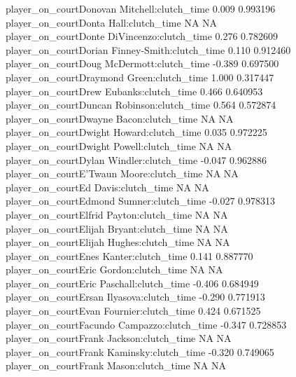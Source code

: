 \documentclass[
  landscape]{article}
\begin{document}
{player\_on\_courtDonovan Mitchell:clutch\_time 0.009 0.993196\\
player\_on\_courtDonta Hall:clutch\_time NA NA\\
player\_on\_courtDonte DiVincenzo:clutch\_time 0.276 0.782609\\
player\_on\_courtDorian Finney-Smith:clutch\_time 0.110 0.912460\\
player\_on\_courtDoug McDermott:clutch\_time -0.389 0.697500\\
player\_on\_courtDraymond Green:clutch\_time 1.000 0.317447\\
player\_on\_courtDrew Eubanks:clutch\_time 0.466 0.640953\\
player\_on\_courtDuncan Robinson:clutch\_time 0.564 0.572874\\
player\_on\_courtDwayne Bacon:clutch\_time NA NA\\
player\_on\_courtDwight Howard:clutch\_time 0.035 0.972225\\
player\_on\_courtDwight Powell:clutch\_time NA NA\\
player\_on\_courtDylan Windler:clutch\_time -0.047 0.962886\\
player\_on\_courtE'Twaun Moore:clutch\_time NA NA\\
player\_on\_courtEd Davis:clutch\_time NA NA\\
player\_on\_courtEdmond Sumner:clutch\_time -0.027 0.978313\\
player\_on\_courtElfrid Payton:clutch\_time NA NA\\
player\_on\_courtElijah Bryant:clutch\_time NA NA\\
player\_on\_courtElijah Hughes:clutch\_time NA NA\\
player\_on\_courtEnes Kanter:clutch\_time 0.141 0.887770\\
player\_on\_courtEric Gordon:clutch\_time NA NA\\
player\_on\_courtEric Paschall:clutch\_time -0.406 0.684949\\
player\_on\_courtErsan Ilyasova:clutch\_time -0.290 0.771913\\
player\_on\_courtEvan Fournier:clutch\_time 0.424 0.671525\\
player\_on\_courtFacundo Campazzo:clutch\_time -0.347 0.728853\\
player\_on\_courtFrank Jackson:clutch\_time NA NA\\
player\_on\_courtFrank Kaminsky:clutch\_time -0.320 0.749065\\
player\_on\_courtFrank Mason:clutch\_time NA NA\\
}
\end{document}

